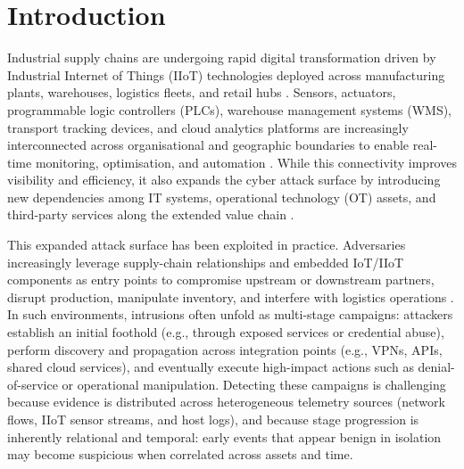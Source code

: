 \documentclass[pdflatex,sn-mathphys-num]{sn-jnl}
\theoremstyle{thmstyleone}%
\theoremstyle{thmstyletwo}%
\theoremstyle{thmstylethree}%
\begin{document}



\maketitle

\section{Introduction}
Industrial supply chains are undergoing rapid digital transformation driven by Industrial Internet of Things (IIoT) technologies deployed across manufacturing plants, warehouses, logistics fleets, and retail hubs \cite{al2020supplychain4}. Sensors, actuators, programmable logic controllers (PLCs), warehouse management systems (WMS), transport tracking devices, and cloud analytics platforms are increasingly interconnected across organisational and geographic boundaries to enable real-time monitoring, optimisation, and automation \cite{tsiknas2021cyber,dhirani2021iiot,taj2023iotSCM}. While this connectivity improves visibility and efficiency, it also expands the cyber attack surface by introducing new dependencies among IT systems, operational technology (OT) assets, and third-party services along the extended value chain \cite{iotsf2021supplychain}.

This expanded attack surface has been exploited in practice. Adversaries increasingly leverage supply-chain relationships and embedded IoT/IIoT components as entry points to compromise upstream or downstream partners, disrupt production, manipulate inventory, and interfere with logistics operations \cite{tsiknas2021cyber,dhirani2021iiot,pt2025iioTThreats, kumar2025security}. In such environments, intrusions often unfold as multi-stage campaigns: attackers establish an initial foothold (e.g., through exposed services or credential abuse), perform discovery and propagation across integration points (e.g., VPNs, APIs, shared cloud services), and eventually execute high-impact actions such as denial-of-service or operational manipulation. Detecting these campaigns is challenging because evidence is distributed across heterogeneous telemetry sources (network flows, IIoT sensor streams, and host logs), and because stage progression is inherently relational and temporal: early events that appear benign in isolation may become suspicious when correlated across assets and time.
\end{document}
